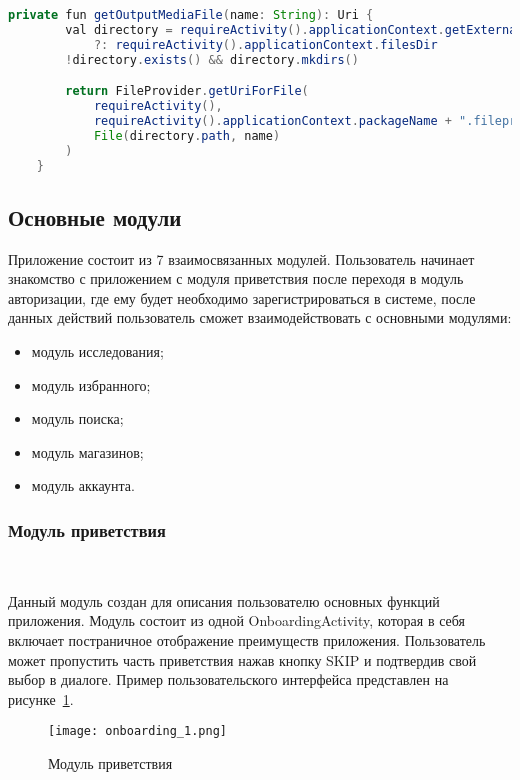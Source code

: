 \begin{lstlisting}[language=Java,label={lst:file_provider},caption={Использование FileProvider}]
    private fun getOutputMediaFile(name: String): Uri {
        val directory = requireActivity().applicationContext.getExternalFilesDir(null)
            ?: requireActivity().applicationContext.filesDir
        !directory.exists() && directory.mkdirs()

        return FileProvider.getUriForFile(
            requireActivity(),
            requireActivity().applicationContext.packageName + ".fileprovider",
            File(directory.path, name)
        )
    }
\end{lstlisting}

\subsection{Основные модули}

Приложение состоит из 7 взаимосвязанных модулей. Пользователь начинает знакомство с приложением с модуля приветствия после переходя в модуль авторизации, где ему будет необходимо зарегистрироваться в системе, после данных действий пользователь сможет взаимодействовать с основными модулями:

\begin{itemize}
  \item модуль исследования;
  \item модуль избранного;
  \item модуль поиска;
  \item модуль магазинов;
  \item модуль аккаунта.
\end{itemize}

\subsubsection{Модуль приветствия}~\par
Данный модуль создан для описания пользователю основных функций приложения. Модуль состоит из одной OnboardingActivity, которая в себя включает постраничное отображение преимуществ приложения. Пользователь может пропустить часть приветствия нажав кнопку SKIP и подтвердив свой выбор в диалоге. Пример пользовательского интерфейса представлен на рисунке~\ref{fig:arch:onboarding_1}.

\begin{figure}[H]
 \centering
   \texttt{[image: onboarding\_1.png]} 
   \caption{Модуль приветствия}
   \label{fig:arch:onboarding_1}
\end{figure}

